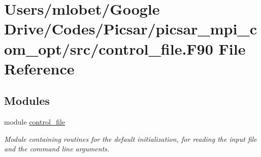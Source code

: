 \hypertarget{control__file_8_f90}{}\section{Users/mlobet/\+Google Drive/\+Codes/\+Picsar/picsar\+\_\+mpi\+\_\+com\+\_\+opt/src/control\+\_\+file.F90 File Reference}
\label{control__file_8_f90}
\subsection*{Modules}
\begin{DoxyCompactItemize}
\item 
module \hyperlink{namespacecontrol__file}{control\+\_\+file}
\begin{DoxyCompactList}\small\item\em Module containing routines for the default initialization, for reading the input file and the command line arguments. \end{DoxyCompactList}\end{DoxyCompactItemize}
